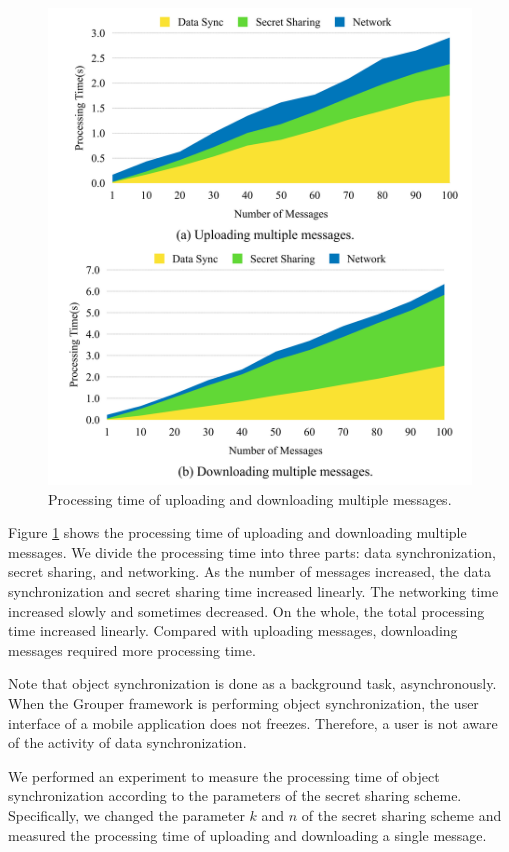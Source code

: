 \documentclass[a4paper,11pt]{report}
\begin{document}
\begin{figure}[t]
	\centering
	\includegraphics[scale=0.15]{multiple_messages}
	\caption{Processing time of uploading and downloading multiple messages.}
	\label{fig:processing_time_multiple_message}
\end{figure}

Figure \ref{fig:processing_time_multiple_message} shows the processing time of uploading and downloading multiple messages.
We divide the processing time into three parts: data synchronization, secret sharing, and networking.
As the number of messages increased, the data synchronization and secret sharing time increased linearly. 
The networking time increased slowly and sometimes decreased.
On the whole, the total processing time increased linearly.
Compared with uploading messages, downloading messages required more processing time.

Note that object synchronization is done as a background task, asynchronously.
When the Grouper framework is performing object synchronization, the user interface of a mobile application does not freezes.
Therefore, a user is not aware of the activity of data synchronization.

We performed an experiment to measure the processing time of object synchronization according to the parameters of the secret sharing scheme.
Specifically, we changed the parameter ${k}$ and ${n}$ of the secret sharing scheme and measured the processing time of uploading and downloading a single message.
\end{document}
